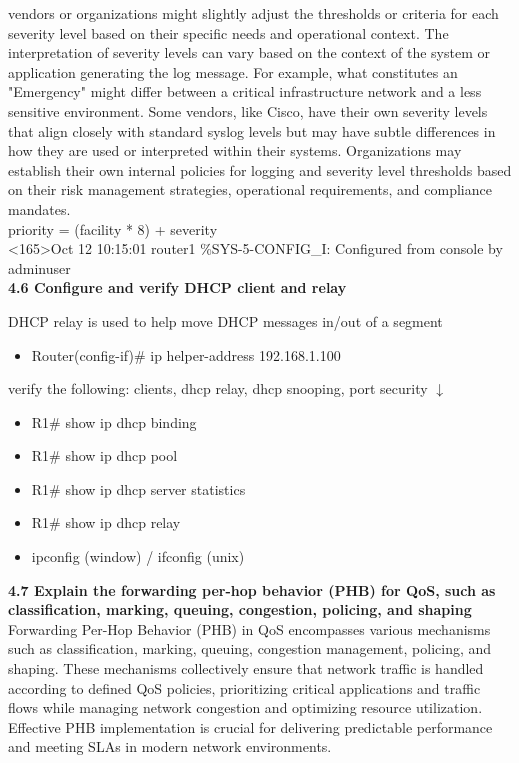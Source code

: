\documentclass{article}
\begin{document}
vendors or organizations might slightly adjust the thresholds or criteria for each severity level based on their specific needs and operational context. The interpretation of severity levels can vary based on the context of the system or application generating the log message. For example, what constitutes an "Emergency" might differ between a critical infrastructure network and a less sensitive environment. Some vendors, like Cisco, have their own severity levels that align closely with standard syslog levels but may have subtle differences in how they are used or interpreted within their systems. Organizations may establish their own internal policies for logging and severity level thresholds based on their risk management strategies, operational requirements, and compliance mandates.\\
	
	priority = (facility * 8) + severity\\
	
	\textless 165\textgreater Oct 12 10:15:01 router1 \%SYS-5-CONFIG\_I: Configured from console by adminuser\\
	
  
\textbf{4.6 Configure and verify DHCP client and relay}

DHCP relay is used to help move DHCP messages in/out of a segment
\begin{itemize}
\item Router(config-if)\# ip helper-address 192.168.1.100
\end{itemize}
		
verify the following: clients, dhcp relay, dhcp snooping, port security $\downarrow$
\begin{itemize}
\item R1\# show ip dhcp binding
\item R1\# show ip dhcp pool
\item R1\# show ip dhcp server statistics
\item R1\# show ip dhcp relay
\item ipconfig (window) / ifconfig (unix)
\end{itemize}
		
\textbf{4.7 Explain the forwarding per-hop behavior (PHB) for QoS, such as classification, marking, queuing, congestion, policing, and shaping}\\

	Forwarding Per-Hop Behavior (PHB) in QoS encompasses various mechanisms such as classification, marking, queuing, congestion management, policing, and shaping. These mechanisms collectively ensure that network traffic is handled according to defined QoS policies, prioritizing critical applications and traffic flows while managing network congestion and optimizing resource utilization. Effective PHB implementation is crucial for delivering predictable performance and meeting SLAs in modern network environments.\\
	
\end{document}
